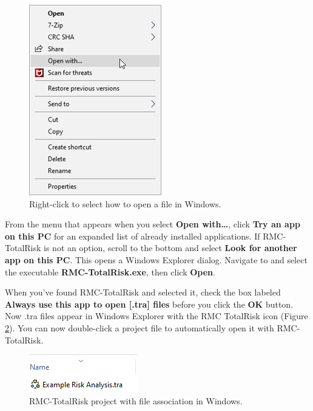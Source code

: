 \documentclass[
]{book}
\begin{document}
\begin{figure}

{\centering \includegraphics{images/figure2} 

}

\caption{Right-click to select how to open a file in Windows.}\label{fig:figure-2}
\end{figure}

From the menu that appears when you select \textbf{Open with\ldots{}}, click \textbf{Try an app on this PC} for an expanded list of already installed applications. If RMC-TotalRisk is not an option, scroll to the bottom and select \textbf{Look for another app on this PC}. This opens a Windows Explorer dialog. Navigate to and select the executable \textbf{RMC-TotalRisk.exe}, then click \textbf{Open}.

When you've found RMC-TotalRisk and selected it, check the box labeled \textbf{Always use this app to open {[}.tra{]} files} before you click the \textbf{OK} button. Now .tra files appear in Windows Explorer with the RMC TotalRisk icon (Figure \ref{fig:figure-3}). You can now double-click a project file to automatically open it with RMC-TotalRisk.

\begin{figure}

{\centering \includegraphics{images/figure3} 

}

\caption{RMC-TotalRisk project with file association in Windows.}\label{fig:figure-3}
\end{figure}
\end{document}
